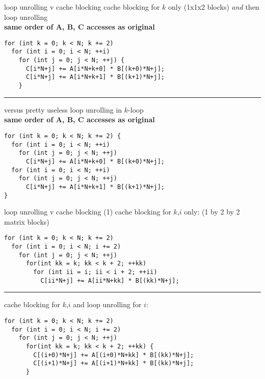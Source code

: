 \begin{frame}[fragile,label=loopUnrollVCacheBlocking3]{loop unrolling v cache blocking}
\lstset{
    style=smaller,language=C
}
cache blocking for $k$ only (1x1x2 blocks) \textit{and} then loop unrolling \\
\textbf{same order of A, B, C accesses as original}
\begin{lstlisting}
for (int k = 0; k < N; k += 2)
  for (int i = 0; i < N; ++i)
    for (int j = 0; j < N; ++j) {
      C[i*N+j] += A[i*N+k+0] * B[(k+0)*N+j];
      C[i*N+j] += A[i*N+k+1] * B[(k+1)*N+j];
    }
\end{lstlisting}
\hrule
versus pretty useless loop unrolling in $k$-loop \\
\textbf{same order of A, B, C accesses as original}
\begin{lstlisting}
for (int k = 0; k < N; k += 2) {
  for (int i = 0; i < N; ++i)
    for (int j = 0; j < N; ++j)
      C[i*N+j] += A[i*N+k+0] * B[(k+0)*N+j];
  for (int i = 0; i < N; ++i)
    for (int j = 0; j < N; ++j)
      C[i*N+j] += A[i*N+k+1] * B[(k+1)*N+j];
}
\end{lstlisting}
\end{frame}


\begin{frame}[fragile,label=loopUnrollVCacheBlocking1]{loop unrolling v cache blocking (1)}
\lstset{
    style=small,language= C
}
cache blocking for $k$,$i$ only: {\small (1 by 2 by 2 matrix blocks)}
\begin{lstlisting}
for (int k = 0; k < N; k += 2)
  for (int i = 0; i < N; i += 2)
    for (int j = 0; j < N; ++j)
      for(int kk = k; kk < k + 2; ++kk)
        for (int ii = i; ii < i + 2; ++ii)
          C[ii*N+j] += A[ii*N+kk] * B[(kk)*N+j];
\end{lstlisting}
\hrule
cache blocking for $k$,$i$ and loop unrolling for $i$:
\begin{lstlisting}
for (int k = 0; k < N; k += 2)
  for (int i = 0; i < N; i += 2)
    for (int j = 0; j < N; ++j)
      for(int kk = k; kk < k + 2; ++kk) {
        C[(i+0)*N+j] += A[(i+0)*N+kk] * B[(kk)*N+j];
        C[(i+1)*N+j] += A[(i+1)*N+kk] * B[(kk)*N+j];
      }
\end{lstlisting}
\end{frame}

